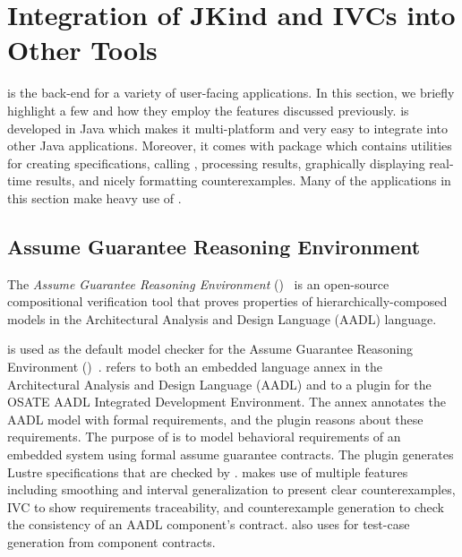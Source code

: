 \section{ Integration of {\sc JKind} and IVCs into Other Tools}


\jkind is the back-end for a variety of user-facing applications. In this section, we briefly highlight a few and how they employ the features discussed previously.
%
\jkind  is developed in Java which makes it multi-platform and very easy to
integrate into other Java applications. Moreover, it comes with
\jkindapi package which contains utilities for creating \lustre
specifications, calling \jkind, processing \jkind results, graphically
displaying real-time results, and nicely formatting counterexamples.
Many of the applications in this section make heavy use of \jkindapi.
%
\subsection{Assume Guarantee Reasoning Environment}

 The {\em Assume Guarantee Reasoning Environment} (\agree)~\cite{cofer2012nfm,QFCS15:backes,hilt2013} is an open-source compositional verification tool that proves properties of hierarchically-composed models in the Architectural Analysis and Design Language (AADL) language.  %
%

\noindent \jkind is used as the default model checker for the Assume
Guarantee Reasoning Environment (\agree)~\cite{cofer2012nfm}. \agree
refers to both an embedded language annex in the Architectural
Analysis and Design Language (AADL) and to a plugin for the OSATE AADL
Integrated Development Environment. The \agree annex annotates the
AADL model with formal requirements, and the plugin reasons about
these requirements. The purpose of \agree is to model behavioral
requirements of an embedded system using formal assume guarantee
contracts. The plugin generates Lustre specifications that are checked
by \jkind.
%
\agree makes use of multiple \jkind features including smoothing and
interval generalization to present clear counterexamples, IVC to show
requirements traceability, and counterexample generation to check the
consistency of an AADL component's contract. \agree also uses \jkind
for test-case generation from component contracts.

